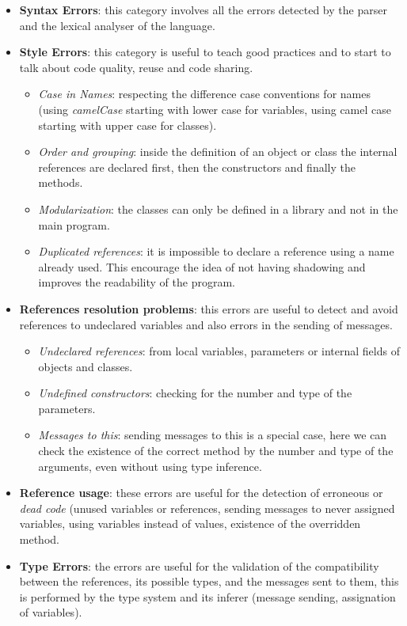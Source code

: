 \begin{itemize}
  \item \textbf{Syntax Errors}: this category involves all the errors detected
  by the parser and the lexical analyser of the language.
  \item \textbf{Style Errors}: this category is useful to teach good practices and to start to talk about code quality, reuse and code sharing.
	\begin{itemize}
		\item \textit{Case in Names}: respecting the difference case conventions for
		names (\eg using \textit{camelCase} starting with lower case for variables,
		using camel case starting with upper case for classes).
		\item \textit{Order and grouping}: inside the definition of an object or class the internal references are declared first, then the constructors and finally the methods.
		\item \textit{Modularization}: the classes can only be defined in a library and not in the main program.		
		\item \textit{Duplicated references}: it is impossible to declare a reference
		using a name already used. This encourage the idea of not having shadowing and
		improves the readability of the program.
	\end{itemize}
  \item \textbf{References resolution problems}: this errors are useful to detect and avoid references to undeclared variables and also errors in the sending of messages.
  
	\begin{itemize}
	  \item \textit{Undeclared references}: from local variables, parameters or internal fields of objects and classes.
	  \item \textit{Undefined constructors}: checking for the number and type of the parameters.
	  \item \textit{Messages to this}: sending messages to this is a special case, here we can check the existence of the correct method by the number and type of the arguments, even without using type inference.
	\end{itemize}
	
  \item \textbf{Reference usage}: these errors are useful for the detection of
  erroneous or \textit{dead code} (\eg unused variables or references, sending
  messages to never assigned variables, using variables instead of values, existence of the overridden method.

  \item \textbf{Type Errors}: the errors are useful for the validation of the compatibility between the references, its possible types, and the messages sent to them, this is performed by the type system and its inferer (\eg message sending, assignation of variables).
\end{itemize}



